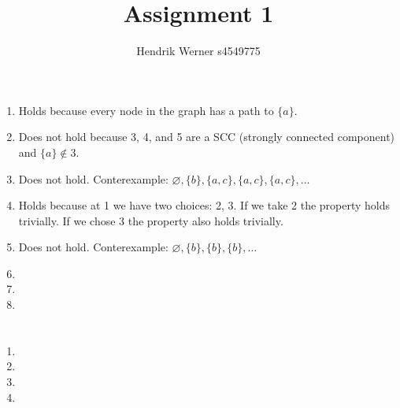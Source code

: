 \documentclass[12pt, a4paper]{article}
\title{Assignment 1}
\author{Hendrik Werner s4549775}
\begin{document}
\maketitle

\section{} %
\begin{enumerate}[a]
	\item %
	Holds because every node in the graph has a path to $\{a\}$.
	\item %
	Does not hold because 3, 4, and 5 are a SCC (strongly connected component) and $\{a\} \not \in 3$.
	\item %
	Does not hold. Conterexample: $\varnothing, \{b\}, \{a, c\}, \{a, c\}, \{a, c\}, \dots$
	\item %
	Holds because at 1 we have two choices: 2, 3. If we take 2 the property holds trivially. If we chose 3 the property also holds trivially.
	\item %
	Does not hold. Conterexample: $\varnothing, \{b\}, \{b\}, \{b\}, \dots$
	\item %
	\item %
	\item %
\end{enumerate}

\section{} %
\begin{enumerate}[a]
	\item %
	\item %
	\item %
	\item %
\end{enumerate}
\end{document}
